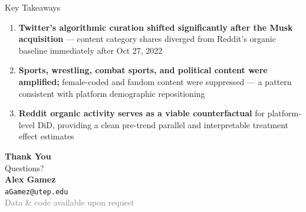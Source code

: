 \documentclass[aspectratio=169]{beamer}
\begin{document}
\begin{frame}{Key Takeaways}
\begin{enumerate}
    \setlength\itemsep{0.8em}
    \item \textbf{Twitter's algorithmic curation shifted significantly after the Musk acquisition} --- content category shares diverged from Reddit's organic baseline immediately after Oct 27, 2022
    \vspace{0.2em}
    \item \textbf{Sports, wrestling, combat sports, and political content were amplified;} female-coded and fandom content were suppressed --- a pattern consistent with platform demographic repositioning
    \vspace{0.2em}
    \item \textbf{Reddit organic activity serves as a viable counterfactual} for platform-level DiD, providing a clean pre-trend parallel and interpretable treatment effect estimates
\end{enumerate}
\end{frame}

\begin{frame}
\begin{center}
\vspace{1em}
{\Huge \textbf{Thank You}}\\[1em]
{\large Questions?}\\[2em]

\textbf{Alex Gamez}\\
\texttt{aGamez@utep.edu}\\[1em]

\textcolor{gray}{\small Data \& code available upon request}
\end{center}
\end{frame}
\end{document}
